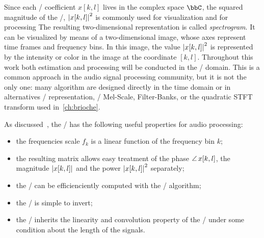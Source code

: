 Since each \STFT/ coefficient $x[k, l]$ lives in the complex space $\bbC$, the squared magnitude of the \STFT/, $\powerOf{x[k,l]}$ is
commonly used for visualization and for processing
The resulting two-dimensional representation is called \textit{spectrogram}.
It can be visualized by means of a two-dimensional image, whose axes represent time frames and frequency bins.
In this image, the value $\powerOf{x[k,l]}$ is represented by the intensity or color in the image at the coordinate $[k,l]$.
Throughout this work both estimation and processing will be conducted in the \STFT/ domain.
This is a common approach in the audio signal processing community, but it is not the only one:
many algorithm are designed directly in the time domain or in alternatives \TF/ representation, \eg/ Mel-Scale, Filter-Banks, or the quadratic STFT transform used in~\cref{ch:brioche}.

As discussed~, the \STFT/ has the following useful properties for audio processing:
\begin{itemize}
    \item the frequencies scale $f_k$ is a linear function of the frequency bin $k$;
    \item the resulting matrix allows easy treatment of the phase $\operatorname*{\angle}{x[k,l]}$, the magnitude $\magnitudeOf{x[k,l]}$ and the power $\powerOf{x[k,l]}$ separately;
    \item the \DFT/ can be efficienciently computed with the \FFT/ algorithm;
    \item the \STFT/ is simple to invert;
    \item the \STFT/ inherits the linearity and convolution property of the \DFT/ under some condition about the length of the signals.
\end{itemize}

